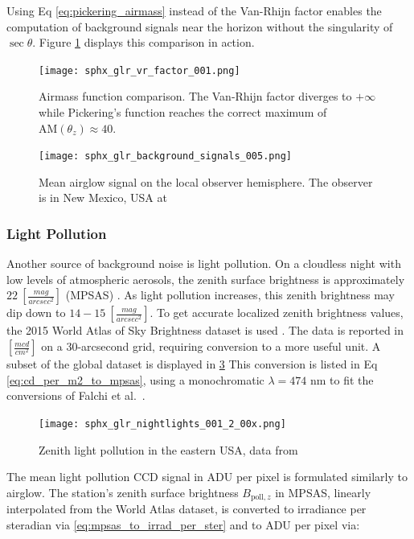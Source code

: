 Using Eq \ref{eq:pickering_airmass} instead of the Van-Rhijn factor enables the computation of background signals near the horizon without the singularity of $\sec \theta$. Figure \ref{fig:airmass_fcns} displays this comparison in action.

\begin{figure}[ht]
  \centering
  \texttt{[image: sphx\_glr\_vr\_factor\_001.png]}
  \caption{Airmass function comparison. The Van-Rhijn factor diverges to $+\infty$ while Pickering's function reaches the correct maximum of $\textrm{AM}(\theta_z) \approx 40$.}
  \label{fig:airmass_fcns}
\end{figure}

\begin{figure}[ht]
  \centering
  \texttt{[image: sphx\_glr\_background\_signals\_005.png]}
  \caption{Mean airglow signal on the local observer hemisphere. The observer is in New Mexico, USA at
  \pogslla}
  \label{fig:airglowhemi}
\end{figure}

\subsubsection{Light Pollution}

Another source of background noise is light pollution. On a cloudless night with low levels of atmospheric aerosols, 
the zenith surface brightness is approximately $22 \: \left[ \frac{mag}{arcsec^2}
\right]$ (MPSAS) \cite{krag2003}. As light pollution increases, this zenith brightness may dip down to
$14-15 \: \left[ \frac{mag}{arcsec^2} \right]$. To get accurate localized zenith brightness values,
 the 2015 World Atlas of Sky Brightness dataset is used \cite{falchi2016_data}. The data is reported in $\left[
	\frac{mcd}{cm^2} \right]$ on a 30-arcsecond grid, requiring conversion to a more useful unit. A subset of the global dataset is displayed in \ref{fig:pollution_data} This conversion is listed in Eq \ref{eq:cd_per_m2_to_mpsas}, using a monochromatic $\lambda = 474$ nm to fit the conversions of Falchi et al.\ \cite{falchi2016}.  

\begin{figure}[ht]
  \centering
  \texttt{[image: sphx\_glr\_nightlights\_001\_2\_00x.png]}
  \caption{Zenith light pollution in the eastern USA, data from \cite{falchi2016_data}}
  \label{fig:pollution_data}
\end{figure}

The mean light pollution CCD signal in ADU per pixel is formulated similarly to airglow. The station's zenith surface brightness $B_{\mathrm{poll},z}$ in MPSAS, linearly interpolated from the World Atlas dataset, is converted to irradiance per steradian via \ref{eq:mpsas_to_irrad_per_ster} and to ADU per pixel via:
 
